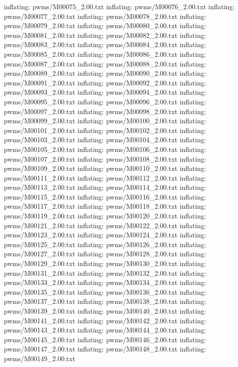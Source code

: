 \documentclass[letterpaper,10pt,english]{sphinxmanual}
\begin{document}
{\begin{sphinxVerbatim}[commandchars=\\\{\}]
  inflating: pwms/M00075\_2.00.txt
  inflating: pwms/M00076\_2.00.txt
  inflating: pwms/M00077\_2.00.txt
  inflating: pwms/M00078\_2.00.txt
  inflating: pwms/M00079\_2.00.txt
  inflating: pwms/M00080\_2.00.txt
  inflating: pwms/M00081\_2.00.txt
  inflating: pwms/M00082\_2.00.txt
  inflating: pwms/M00083\_2.00.txt
  inflating: pwms/M00084\_2.00.txt
  inflating: pwms/M00085\_2.00.txt
  inflating: pwms/M00086\_2.00.txt
  inflating: pwms/M00087\_2.00.txt
  inflating: pwms/M00088\_2.00.txt
  inflating: pwms/M00089\_2.00.txt
  inflating: pwms/M00090\_2.00.txt
  inflating: pwms/M00091\_2.00.txt
  inflating: pwms/M00092\_2.00.txt
  inflating: pwms/M00093\_2.00.txt
  inflating: pwms/M00094\_2.00.txt
  inflating: pwms/M00095\_2.00.txt
  inflating: pwms/M00096\_2.00.txt
  inflating: pwms/M00097\_2.00.txt
  inflating: pwms/M00098\_2.00.txt
  inflating: pwms/M00099\_2.00.txt
  inflating: pwms/M00100\_2.00.txt
  inflating: pwms/M00101\_2.00.txt
  inflating: pwms/M00102\_2.00.txt
  inflating: pwms/M00103\_2.00.txt
  inflating: pwms/M00104\_2.00.txt
  inflating: pwms/M00105\_2.00.txt
  inflating: pwms/M00106\_2.00.txt
  inflating: pwms/M00107\_2.00.txt
  inflating: pwms/M00108\_2.00.txt
  inflating: pwms/M00109\_2.00.txt
  inflating: pwms/M00110\_2.00.txt
  inflating: pwms/M00111\_2.00.txt
  inflating: pwms/M00112\_2.00.txt
  inflating: pwms/M00113\_2.00.txt
  inflating: pwms/M00114\_2.00.txt
  inflating: pwms/M00115\_2.00.txt
  inflating: pwms/M00116\_2.00.txt
  inflating: pwms/M00117\_2.00.txt
  inflating: pwms/M00118\_2.00.txt
  inflating: pwms/M00119\_2.00.txt
  inflating: pwms/M00120\_2.00.txt
  inflating: pwms/M00121\_2.00.txt
  inflating: pwms/M00122\_2.00.txt
  inflating: pwms/M00123\_2.00.txt
  inflating: pwms/M00124\_2.00.txt
  inflating: pwms/M00125\_2.00.txt
  inflating: pwms/M00126\_2.00.txt
  inflating: pwms/M00127\_2.00.txt
  inflating: pwms/M00128\_2.00.txt
  inflating: pwms/M00129\_2.00.txt
  inflating: pwms/M00130\_2.00.txt
  inflating: pwms/M00131\_2.00.txt
  inflating: pwms/M00132\_2.00.txt
  inflating: pwms/M00133\_2.00.txt
  inflating: pwms/M00134\_2.00.txt
  inflating: pwms/M00135\_2.00.txt
  inflating: pwms/M00136\_2.00.txt
  inflating: pwms/M00137\_2.00.txt
  inflating: pwms/M00138\_2.00.txt
  inflating: pwms/M00139\_2.00.txt
  inflating: pwms/M00140\_2.00.txt
  inflating: pwms/M00141\_2.00.txt
  inflating: pwms/M00142\_2.00.txt
  inflating: pwms/M00143\_2.00.txt
  inflating: pwms/M00144\_2.00.txt
  inflating: pwms/M00145\_2.00.txt
  inflating: pwms/M00146\_2.00.txt
  inflating: pwms/M00147\_2.00.txt
  inflating: pwms/M00148\_2.00.txt
  inflating: pwms/M00149\_2.00.txt

\end{sphinxVerbatim}}
\end{document}
